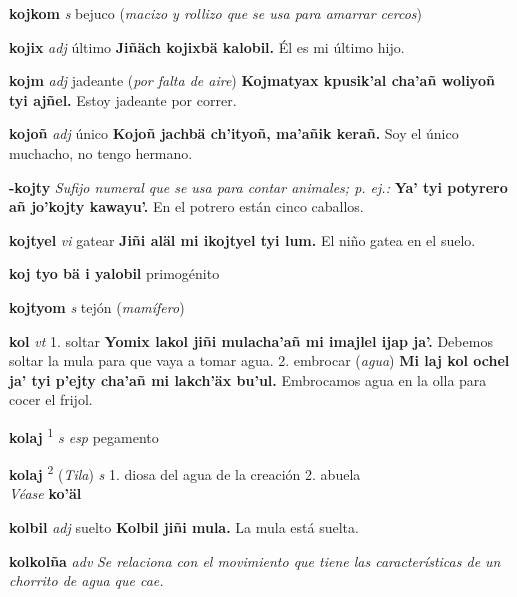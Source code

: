\documentclass[10pt]{scrbook}
\newcommand{\entry}[1]{\textbf{#1}}
\newcommand{\onedefinition}[1]{#1.}
\newcommand{\defsuperscript}[1]{\textsuperscript{#1}}
\newcommand{\nontranslationdef}[1]{\textit{#1}}
\newcommand{\partofspeech}[1]{\textit{#1}}
\newcommand{\spanishtranslation}[1]{#1}
\newcommand{\clarification}[1]{(\textit{#1})}
\newcommand{\cholexample}[1]{\textbf{#1}}
\newcommand{\exampletranslation}[1]{#1}
\newcommand{\alsosee}[1]{\\\textit{Véase} \textbf{#1}}
\newcommand{\relevantdialect}[1]{(\textit{#1})}
\begin{document}
\begin{multicols}{2}
\entry{kojkom}
\partofspeech{s}
\spanishtranslation{bejuco}
\clarification{macizo y rollizo que se usa para amarrar cercos}

\entry{kojix}
\partofspeech{adj}
\spanishtranslation{último}
\cholexample{Jiñäch kojixbä kalobil.}
\exampletranslation{Él es mi último hijo.}

\entry{kojm}
\partofspeech{adj}
\spanishtranslation{jadeante}
\clarification{por falta de aire}
\cholexample{Kojmatyax kpusik'al cha'añ woliyoñ tyi ajñel.}
\exampletranslation{Estoy jadeante por correr.}

\entry{kojoñ}
\partofspeech{adj}
\spanishtranslation{único}
\cholexample{Kojoñ jachbä ch'ityoñ, ma'añik kerañ.}
\exampletranslation{Soy el único muchacho, no tengo hermano.}

\entry{-kojty}
\nontranslationdef{Sufijo numeral que se usa para contar animales; p. ej.:}
\cholexample{Ya' tyi potyrero añ jo'kojty kawayu'.}
\exampletranslation{En el potrero están cinco caballos.}

\entry{kojtyel}
\partofspeech{vi}
\spanishtranslation{gatear}
\cholexample{Jiñi aläl mi ikojtyel tyi lum.}
\exampletranslation{El niño gatea en el suelo.}

\entry{koj tyo bä i yalobil}
\spanishtranslation{primogénito}

\entry{kojtyom}
\partofspeech{s}
\spanishtranslation{tejón}
\clarification{mamífero}

\entry{kol}
\partofspeech{vt}
\onedefinition{1}
\spanishtranslation{soltar}
\cholexample{Yomix lakol jiñi mulacha'añ mi imajlel ijap ja'.}
\exampletranslation{Debemos soltar la mula para que vaya a tomar agua.}
\onedefinition{2}
\spanishtranslation{embrocar}
\clarification{agua}
\cholexample{Mi laj kol ochel ja' tyi p'ejty cha'añ mi lakch'äx bu'ul.}
\exampletranslation{Embrocamos agua en la olla para cocer el frijol.}

\entry{kolaj}
\defsuperscript{1}
\partofspeech{s esp}
\spanishtranslation{pegamento}

\entry{kolaj}
\defsuperscript{2}
\relevantdialect{Tila}
\partofspeech{s}
\onedefinition{1}
\spanishtranslation{diosa del agua de la creación}
\onedefinition{2}
\spanishtranslation{abuela}
\alsosee{ko'äl}

\entry{kolbil}
\partofspeech{adj}
\spanishtranslation{suelto}
\cholexample{Kolbil jiñi mula.}
\exampletranslation{La mula está suelta.}

\entry{kolkolña}
\partofspeech{adv}
\nontranslationdef{Se relaciona con el movimiento que tiene las características de un chorrito de agua que cae.}


\end{multicols}
\end{document}
